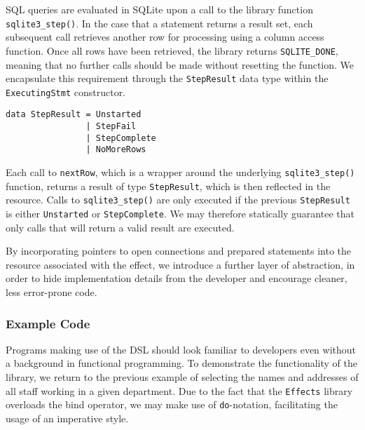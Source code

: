 \documentclass[preprint]{sigplanconf}
\begin{document}
SQL queries are evaluated in SQLite upon a call to the library function \texttt{sqlite3\_step()}. In the case that a statement returns a result set, each subsequent call retrieves another row for processing using a column access function. Once all rows have been retrieved, the library returns \texttt{SQLITE\_DONE}, meaning that no further calls should be made without resetting the function. We encapsulate this requirement through the \texttt{StepResult} data type within the \texttt{ExecutingStmt} constructor. 
{\small
\begin{verbatim}
data StepResult = Unstarted
                | StepFail
                | StepComplete
                | NoMoreRows
\end{verbatim}
}
Each call to \texttt{nextRow}, which is a wrapper around the underlying \texttt{sqlite3\_step()} function, returns a result of type \texttt{StepResult}, which is then reflected in the resource. Calls to \texttt{sqlite3\_step()} are only executed if the previous \texttt{StepResult} is either \texttt{Unstarted} or \texttt{StepComplete}. We may therefore statically guarantee that only calls that will return a valid result are executed. 

By incorporating pointers to open connections and prepared statements into the resource associated with the effect, we introduce a further layer of abstraction, in order to hide implementation details from the developer and encourage cleaner, less error-prone code. 

\subsubsection{Example Code}
Programs making use of the DSL should look familiar to developers even without a background in functional programming. To demonstrate the functionality of the library, we return to the previous example of selecting the names and addresses of all staff working in a given department. Due to the fact that the \texttt{Effects} library overloads the bind operator, we may make use of \texttt{do}-notation, facilitating the usage of an imperative style.
\end{document}
